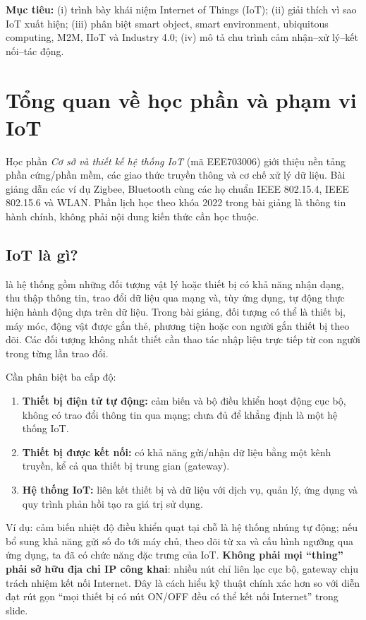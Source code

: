 \begin{notebox}
\textbf{Mục tiêu:} (i) trình bày khái niệm Internet of Things (IoT); (ii) giải thích vì sao IoT xuất hiện; (iii) phân biệt smart object, smart environment, ubiquitous computing, M2M, IIoT và Industry 4.0; (iv) mô tả chu trình cảm nhận--xử lý--kết nối--tác động.
\end{notebox}
\section{Tổng quan về học phần và phạm vi IoT}
Học phần \textit{Cơ sở và thiết kế hệ thống IoT} (mã EEE703006) giới thiệu nền tảng phần cứng/phần mềm, các giao thức truyền thông và cơ chế xử lý dữ liệu. Bài giảng dẫn các ví dụ Zigbee, Bluetooth cùng các họ chuẩn IEEE 802.15.4, IEEE 802.15.6 và WLAN. Phần lịch học theo khóa 2022 trong bài giảng là thông tin hành chính, không phải nội dung kiến thức cần học thuộc.

\subsection{IoT là gì?}
 là hệ thống gồm những đối tượng vật lý hoặc thiết bị có khả năng nhận dạng, thu thập thông tin, trao đổi dữ liệu qua mạng và, tùy ứng dụng, tự động thực hiện hành động dựa trên dữ liệu. Trong bài giảng, đối tượng có thể là thiết bị, máy móc, động vật được gắn thẻ, phương tiện hoặc con người gắn thiết bị theo dõi. Các đối tượng không nhất thiết cần thao tác nhập liệu trực tiếp từ con người trong từng lần trao đổi.

Cần phân biệt ba cấp độ:
\begin{enumerate}
\item \textbf{Thiết bị điện tử tự động:} cảm biến và bộ điều khiển hoạt động cục bộ, không có trao đổi thông tin qua mạng; chưa đủ để khẳng định là một hệ thống IoT.
\item \textbf{Thiết bị được kết nối:} có khả năng gửi/nhận dữ liệu bằng một kênh truyền, kể cả qua thiết bị trung gian (gateway).
\item \textbf{Hệ thống IoT:} liên kết thiết bị và dữ liệu với dịch vụ, quản lý, ứng dụng và quy trình phản hồi tạo ra giá trị sử dụng.
\end{enumerate}

Ví dụ: cảm biến nhiệt độ điều khiển quạt tại chỗ là hệ thống nhúng tự động; nếu bổ sung khả năng gửi số đo tới máy chủ, theo dõi từ xa và cấu hình ngưỡng qua ứng dụng, ta đã có chức năng đặc trưng của IoT. \textbf{Không phải mọi ``thing'' phải sở hữu địa chỉ IP công khai}: nhiều nút chỉ liên lạc cục bộ, gateway chịu trách nhiệm kết nối Internet. Đây là cách hiểu kỹ thuật chính xác hơn so với diễn đạt rút gọn ``mọi thiết bị có nút ON/OFF đều có thể kết nối Internet'' trong slide.

